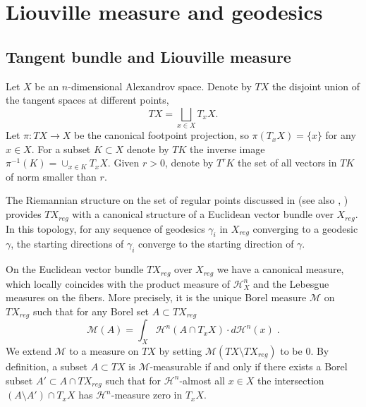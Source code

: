 \documentclass[12pt,leqno,intlimits]{amsart}
\numberwithin{equation}{section}
\theoremstyle{definition}
\theoremstyle{remark}
\newtheorem{rem}[thm]{Remark}
\def\:{\colon}
\begin{document}





\section{Liouville measure and geodesics} \label{sec:Liou}
\subsection{Tangent bundle and Liouville measure} \label{subsec:tb}
Let $X$ be an $n$-dimensional Alexandrov space.
Denote by $TX$ the  disjoint union of the tangent spaces at different points,
\[TX=\bigsqcup_{x\in X} T_x X.\]
Let $\pi\:TX\to X$ be the canonical footpoint projection, so $\pi (T_xX)=\{x\}$ for any $x\in X$.
For a subset $K\subset X$ denote by $TK$ the inverse image $\pi^{-1} (K)= \cup _{x\in K} T_xX$. Given $r>0$, denote by $T^r K$ the set of all vectors in $TK$
	of norm smaller than $r$.

 The  Riemannian structure on the set of regular points discussed in  \cite{Otsu-Shioya}  (see also  \cite{Shioya}, \cite{Per-DC}) provides  $TX_{reg}$ with a canonical structure of a Euclidean vector bundle over $X_{reg}$. In this topology, for any sequence of geodesics $\gamma _i$ in $X_{reg}$ converging to a geodesic $\gamma$, the starting directions of $\gamma _i$ converge to the starting direction of $\gamma$.

 On the Euclidean vector bundle $TX_{reg}$ over $X_{reg}$ we have a canonical measure, which locally coincides with the product measure of $\mathcal H^n _X$ and the Lebesgue measures on the fibers. More precisely,
 it is the unique Borel measure $\mathcal M$ on $TX_{reg}$ such that for any  Borel set $A\subset TX_{reg}$
 $$\mathcal M(A)= \int _X \mathcal H^n(A \cap T_x X) \cdot d\mathcal H^n (x) \; .$$
 We extend $\mathcal M$ to a measure on $TX$ by setting $\mathcal M(TX\setminus TX_{reg})$ to be $0$.
By definition, a subset $A\subset TX$ is $\mathcal M$-measurable if and only if there exists  a Borel subset $A'\subset A\cap TX_{reg}$ such that
for $\mathcal H^n$-almost all $x\in X$ the intersection $(A\setminus A') \cap T_xX$ has $\mathcal H^n$-measure zero in $T_xX$.
\end{document}
